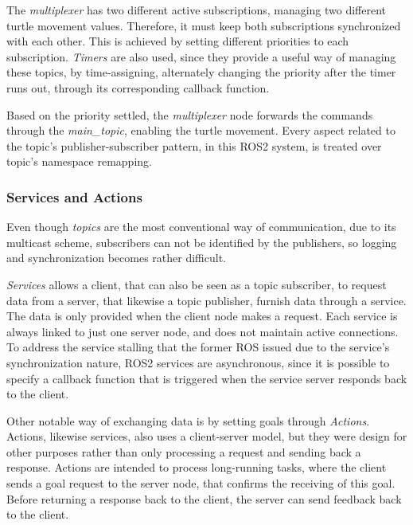 The \textit{multiplexer} has two different active subscriptions, managing two different turtle movement values. Therefore, it must keep both subscriptions synchronized with each other. This is achieved by setting different priorities to each subscription. %
\textit{Timers} are also used, since they provide a useful way of managing these topics, by time-assigning, alternately changing the priority after the timer runs out, through its corresponding callback function.

Based on the priority settled, the \textit{multiplexer} node forwards the commands through the \textit{main\_topic}, enabling the turtle movement. Every aspect related to the topic's publisher-subscriber pattern, in this ROS2 system, is treated over topic's namespace remapping.

\subsubsection{Services and Actions}

Even though \textit{topics} are the most conventional way of communication, due to its multicast scheme, subscribers can not be identified by the publishers, so logging and synchronization becomes rather difficult.

\textit{Services} allows a client, that can also be seen as a topic subscriber, to request data from a server, that likewise a topic publisher, furnish data through a service. The data is only provided when the client node makes a request. Each service is always linked to just one server node, and does not maintain active connections. To address the service stalling that the former ROS issued due to the service's synchronization nature, ROS2 services are asynchronous, since it is possible to specify a callback function that is triggered when the service server responds back to the client.

Other notable way of exchanging data is by setting goals through \textit{Actions}. Actions, likewise services, also uses a client-server model, but they were design for other purposes rather than only processing a request and sending back a response. Actions are intended to process long-running tasks, where the client sends a goal request to the server node, that confirms the receiving of this goal. Before returning a response back to the client, the server can send feedback back to the client. %


